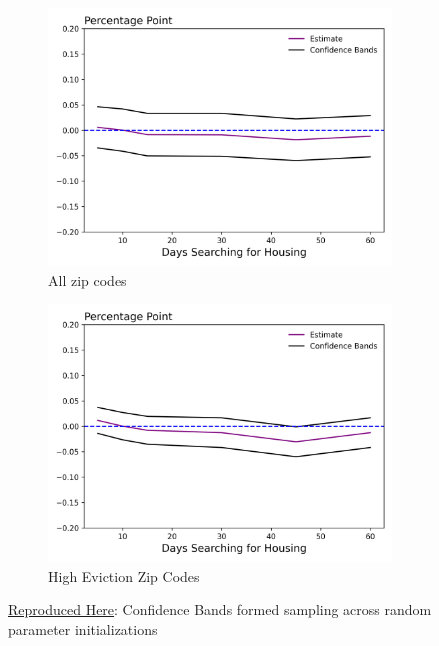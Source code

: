 \documentclass[a4paper,12pt]{article}
\begin{document}
\begin{figure}[htbp]
\centering
\begin{subfigure}{.48\textwidth}
    \centering
    \includegraphics[width=.95\linewidth]{figures/rtc/results/cceh/rfp_False_False_3.png}
    \caption{All zip codes}
    \label{SUBFIGURE LABEL 3}
\end{subfigure}
\begin{subfigure}{.48\textwidth}
    \centering
    \includegraphics[width=.95\linewidth]{figures/rtc/results/cceh/rfp_True_False_3.png}
    \caption{High Eviction Zip Codes}
    \label{SUBFIGURE LABEL 4}
\end{subfigure}
\caption{ \href{https://github.com/pharringtonp19/evictions/blob/main/scripts/cceh/primary/cluster_diff_n_diff.py}{Reproduced Here}: Confidence Bands formed sampling across random parameter initializations}
\label{fig:rfp_results}
\end{figure}
\end{document}
